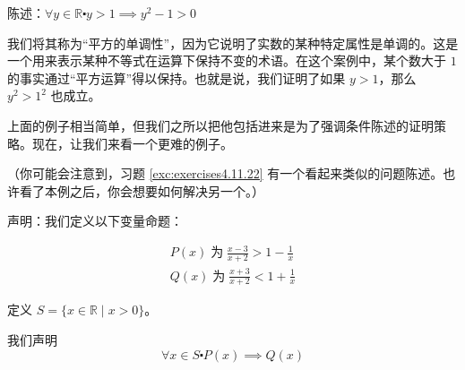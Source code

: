 \begin{example}[平方的单调性]

    陈述：$\forall y \in \mathbb{R} \centerdot y>1 \implies y^2-1>0$
\end{example}

\begin{center}
    \noindent {}
\end{center}

我们将其称为``平方的单调性''，因为它说明了实数的某种特定属性是单调的。这是一个用来表示某种不等式在运算下保持不变的术语。在这个案例中，某个数大于 $1$ 的事实通过``平方运算''得以保持。也就是说，我们证明了如果 $y > 1$，那么 $y^2 > 1^2$ 也成立。

上面的例子相当简单，但我们之所以把他包括进来是为了强调条件陈述的证明策略。现在，让我们来看一个更难的例子。

（你可能会注意到，习题 \ref{exc:exercises4.11.22} 有一个看起来类似的问题陈述。也许看了本例之后，你会想要如何解决另一个。）\\

\begin{example}[解决不等式问题]\label{ex:example4.9.8}

    声明：我们定义以下变量命题：

    \begin{align*}
        P(x) \;\text{为}\; \frac{x-3}{x+2}>1-\frac{1}{x} \\
        Q(x) \;\text{为}\; \frac{x+3}{x+2}<1+\frac{1}{x}
    \end{align*}

    定义 $S = \{x \in \mathbb{R} \mid x > 0\}$。

    我们声明
    \[\forall x \in S \centerdot P(x) \implies Q(x)\]
\end{example}

